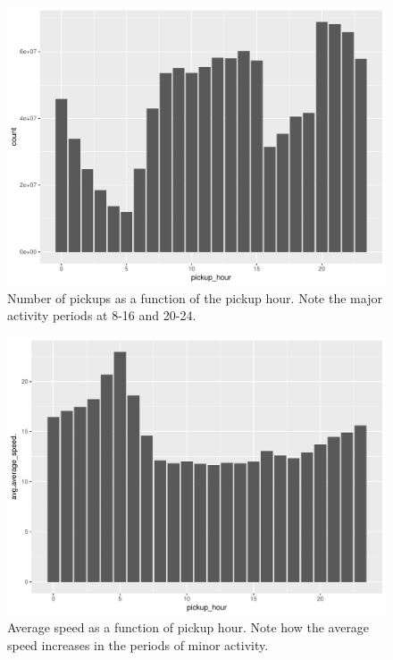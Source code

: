 \documentclass{acm_proc_article-sp-sigmod09}
\begin{document}
\begin{figure}
	\centering
	\includegraphics[width=1\columnwidth]{resources/base_plots/pickup_hour_dist.pdf}
	\caption{Number of pickups as a function of the pickup hour. Note the major activity periods at 8-16 and 20-24.}
	\label{fig:pickupHourDist}
\end{figure}

\begin{figure}
	\centering
	\includegraphics[width=1\columnwidth]{resources/base_plots/avg_speed_by_pickup_hour_dist.pdf}
	\caption{Average speed as a function of pickup hour. Note how the average speed increases in the periods of minor activity.}
	\label{fig:speedByHour}
\end{figure}
\end{document}
